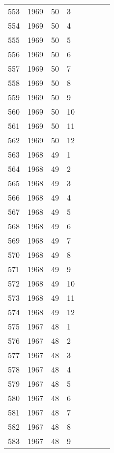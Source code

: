 \begin{longtable}{ |l|l|l|l|l|l|l|l| }
553 & 1969 & 50 &     3 &         &  &  & \\
554 & 1969 & 50 &     4 &         &  &  & \\
555 & 1969 & 50 &     5 &         &  &  & \\
556 & 1969 & 50 &     6 &         &  &  & \\
557 & 1969 & 50 &     7 &         &  &  & \\
558 & 1969 & 50 &     8 &         &  &  & \\
559 & 1969 & 50 &     9 &         &  &  & \\
560 & 1969 & 50 &    10 &         &  &  & \\
561 & 1969 & 50 &    11 &         &  &  & \\
562 & 1969 & 50 &    12 &         &  &  & \\
563 & 1968 & 49 &     1 &         &  &  & \\
564 & 1968 & 49 &     2 &         &  &  & \\
565 & 1968 & 49 &     3 &         &   &  & \\
566 & 1968 & 49 &     4 &         &  &  & \\
567 & 1968 & 49 &     5 &         &  &  & \\
568 & 1968 & 49 &     6 &         &  &  & \\
569 & 1968 & 49 &     7 &         &  &  & \\
570 & 1968 & 49 &     8 &         &  &  & \\
571 & 1968 & 49 &     9 &         &  &  & \\
572 & 1968 & 49 &    10 &         &  &  & \\
573 & 1968 & 49 &    11 &         &  &  & \\
574 & 1968 & 49 &    12 &         &  &  & \\
575 & 1967 & 48 &     1 &         &  &  & \\
576 & 1967 & 48 &     2 &         &  &  & \\
577 & 1967 & 48 &     3 &         &  &  & \\
578 & 1967 & 48 &     4 &         &  &  & \\
579 & 1967 & 48 &     5 &         &  &  & \\
580 & 1967 & 48 &     6 &         &  &  & \\
581 & 1967 & 48 &     7 &         &  &  & \\
582 & 1967 & 48 &     8 &         &  &  & \\
583 & 1967 & 48 &     9 &         &  &  & \\

\end{longtable}
